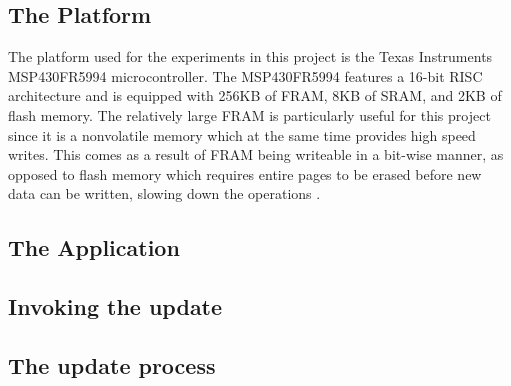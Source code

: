 \subsection{The Platform}
The platform used for the experiments in this project is the Texas Instruments MSP430FR5994 microcontroller. The MSP430FR5994 features a 16-bit RISC architecture and is equipped with 256KB of FRAM, 8KB of SRAM, and 2KB of flash memory. The relatively large FRAM is particularly useful for this project since it is a nonvolatile memory which at the same time provides high speed writes. This comes as a result of FRAM being writeable in a bit-wise manner, as opposed to flash memory which requires entire pages to be erased before new data can be written, slowing down the operations \cite{framReport}.
\subsection{The Application}
\subsection{Invoking the update}
\subsection{The update process}
